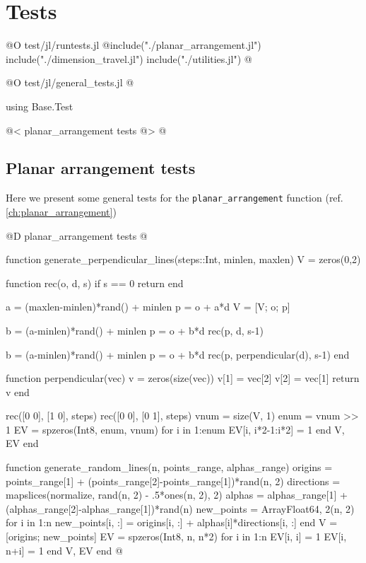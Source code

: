 \appendix
\chapter{Tests}

@O test/jl/runtests.jl
@{include("./planar_arrangement.jl")
include("./dimension_travel.jl")
include("./utilities.jl")
@}

@O test/jl/general_tests.jl
@{using Base.Test

@< planar\_arrangement tests @>
@}

\section{Planar arrangement tests}
\label{ch:planar_arrangement_tests}

Here we present some general tests for the \texttt{planar\_arrangement} function (ref. \ref{ch:planar_arrangement})

@D planar\_arrangement tests
@{function generate_perpendicular_lines(steps::Int, minlen, maxlen)
    V = zeros(0,2)

    function rec(o, d, s)
        if s == 0 return end

        a = (maxlen-minlen)*rand() + minlen
        p = o + a*d
        V = [V; o; p]

        b = (a-minlen)*rand() + minlen
        p = o + b*d
        rec(p, d, s-1)

        b = (a-minlen)*rand() + minlen
        p = o + b*d
        rec(p, perpendicular(d), s-1)
    end

    function perpendicular(vec)
        v = zeros(size(vec))
        v[1] = vec[2]
        v[2] = vec[1]
        return v
    end

    rec([0 0], [1 0], steps)
    rec([0 0], [0 1], steps)
    vnum = size(V, 1)
    enum = vnum >> 1
    EV = spzeros(Int8, enum, vnum)
    for i in 1:enum
        EV[i, i*2-1:i*2] = 1
    end
    V, EV
end


function generate_random_lines(n, points_range, alphas_range)
    origins = points_range[1] + (points_range[2]-points_range[1])*rand(n, 2)
    directions = mapslices(normalize, rand(n, 2) - .5*ones(n, 2), 2)
    alphas = alphas_range[1] + (alphas_range[2]-alphas_range[1])*rand(n)
    new_points = Array{Float64, 2}(n, 2)
    for i in 1:n
        new_points[i, :] = origins[i, :] + alphas[i]*directions[i, :]
    end
    V = [origins; new_points]
    EV = spzeros(Int8, n, n*2)
    for i in 1:n
        EV[i, i] = 1
        EV[i, n+i] = 1
    end
    V, EV
end
@}